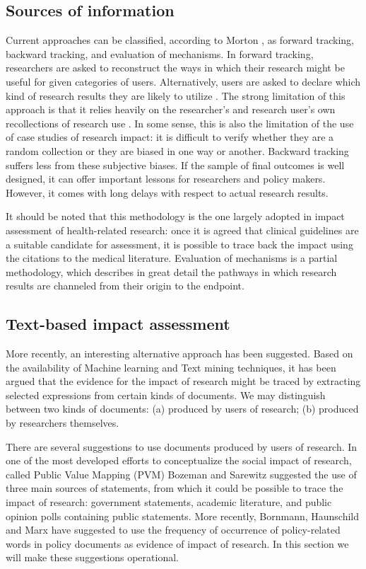 \documentclass[b5paper,]{book}
\theoremstyle{definition}
\theoremstyle{definition}
\theoremstyle{definition}
\theoremstyle{remark}
\begin{document}
\subsection{Sources of information}\label{sources-of-information-1}

Current approaches can be classified, according to Morton
\citep{morton2015progressing}, as forward tracking, backward tracking,
and evaluation of mechanisms. In forward tracking, researchers are asked
to reconstruct the ways in which their research might be useful for
given categories of users. Alternatively, users are asked to declare
which kind of research results they are likely to utilize
\citep{tang2000pilot}. The strong limitation of this approach is that it
relies heavily on the researcher's and research user's own recollections
of research use \citep{nutley2007using, donovan2011state}. In some
sense, this is also the limitation of the use of case studies of
research impact: it is difficult to verify whether they are a random
collection or they are biased in one way or another. Backward tracking
suffers less from these subjective biases. If the sample of final
outcomes is well designed, it can offer important lessons for
researchers and policy makers. However, it comes with long delays with
respect to actual research results.

It should be noted that this methodology is the one largely adopted in
impact assessment of health-related research: once it is agreed that
clinical guidelines are a suitable candidate for assessment, it is
possible to trace back the impact using the citations to the medical
literature. Evaluation of mechanisms is a partial methodology, which
describes in great detail the pathways in which research results are
channeled from their origin to the endpoint.

\subsection{Text-based impact
assessment}\label{text-based-impact-assessment}

More recently, an interesting alternative approach has been suggested.
Based on the availability of Machine learning and Text mining
techniques, it has been argued that the evidence for the impact of
research might be traced by extracting selected expressions from certain
kinds of documents. We may distinguish between two kinds of documents:
(a) produced by users of research; (b) produced by researchers
themselves.

There are several suggestions to use documents produced by users of
research. In one of the most developed efforts to conceptualize the
social impact of research, called Public Value Mapping (PVM) Bozeman and
Sarewitz \citep{bozeman2011public} suggested the use of three main
sources of statements, from which it could be possible to trace the
impact of research: government statements, academic literature, and
public opinion polls containing public statements. More recently,
Bornmann, Haunschild and Marx \citep{bornmann2016policy} have suggested
to use the frequency of occurrence of policy-related words in policy
documents as evidence of impact of research. In this section we will
make these suggestions operational.
\end{document}
